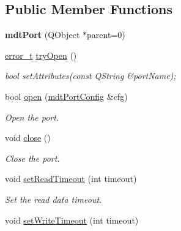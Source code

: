 \subsection*{Public Member Functions}
\begin{DoxyCompactItemize}
\item 
\hypertarget{classmdt_port_ac466eac9d1a54ea0e04c998660ad75ec}{
{\bfseries mdtPort} (QObject $\ast$parent=0)}
\label{classmdt_port_ac466eac9d1a54ea0e04c998660ad75ec}

\item 
\hyperlink{classmdt_abstract_port_ad4121bb930c95887e77f8bafa065a85e}{error\_\-t} \hyperlink{classmdt_port_ad3c958b5559e39ed8bb6b0c699809755}{tryOpen} ()
\begin{DoxyCompactList}\small\item\em bool setAttributes(const QString \&portName); \end{DoxyCompactList}\item 
bool \hyperlink{classmdt_port_ac7158d1d718dbc6068648bbed1eab747}{open} (\hyperlink{classmdt_port_config}{mdtPortConfig} \&cfg)
\begin{DoxyCompactList}\small\item\em Open the port. \end{DoxyCompactList}\item 
void \hyperlink{classmdt_port_aa494585a96a16c80a04dd32b0b6a0d4c}{close} ()
\begin{DoxyCompactList}\small\item\em Close the port. \end{DoxyCompactList}\item 
\hypertarget{classmdt_port_aa77b266f23744f1b53ae589f986be101}{
void \hyperlink{classmdt_port_aa77b266f23744f1b53ae589f986be101}{setReadTimeout} (int timeout)}
\label{classmdt_port_aa77b266f23744f1b53ae589f986be101}

\begin{DoxyCompactList}\small\item\em Set the read data timeout. \end{DoxyCompactList}\item 
\hypertarget{classmdt_port_a2acb6e7bedacdadf78ee735dc611abfa}{
void \hyperlink{classmdt_port_a2acb6e7bedacdadf78ee735dc611abfa}{setWriteTimeout} (int timeout)}
\label{classmdt_port_a2acb6e7bedacdadf78ee735dc611abfa}


\end{DoxyCompactItemize}
